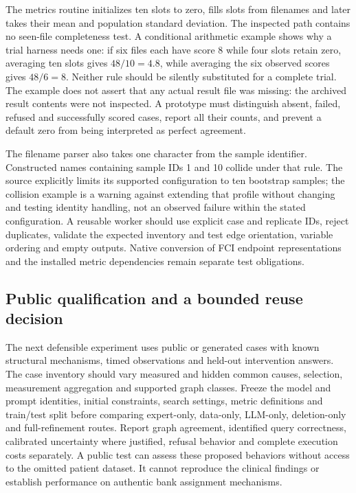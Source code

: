 The metrics routine initializes ten slots to zero, fills slots from filenames
and later takes their mean and population standard deviation. The inspected
path contains no seen-file completeness test. A conditional arithmetic example
shows why a trial harness needs one: if six files each have score 8 while four
slots retain zero, averaging ten slots gives $48/10=4.8$, while averaging the
six observed scores gives $48/6=8$. Neither rule should be silently substituted
for a complete trial. The example does not assert that any actual result file
was missing: the archived result contents were not inspected. A prototype
must distinguish absent, failed, refused and successfully scored cases, report
all their counts, and prevent a default zero from being interpreted as perfect
agreement.\citep{exec24_ecmo_code,exec24_ecmo_reference}

The filename parser also takes one character from the sample identifier.
Constructed names containing sample IDs 1 and 10 collide under that rule.
The source explicitly limits its supported configuration to ten bootstrap
samples; the collision example is a warning against extending that profile
without changing and testing identity handling, not an observed failure within
the stated configuration. A reusable worker should use explicit case and
replicate IDs, reject duplicates, validate the expected inventory and test
edge orientation, variable ordering and empty outputs. Native conversion of
FCI endpoint representations and the installed metric dependencies remain
separate test obligations.\citep{exec24_ecmo_code,exec24_ecmo_reference}

\subsection{Public qualification and a bounded reuse decision}
The next defensible experiment uses public or generated cases with known
structural mechanisms, timed observations and held-out intervention answers.
The case inventory should vary measured and hidden common causes, selection,
measurement aggregation and supported graph classes. Freeze the model and
prompt identities, initial constraints, search settings, metric definitions
and train/test split before comparing expert-only, data-only, LLM-only,
deletion-only and full-refinement routes. Report graph agreement, identified
query correctness, calibrated uncertainty where justified, refusal behavior
and complete execution costs separately. A public test can assess these
proposed behaviors without access to the omitted patient dataset. It cannot
reproduce the clinical findings or establish performance on authentic bank
assignment mechanisms.\citep{exec24_ecmo_reference}

